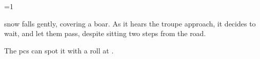 
\ifnum\value{cycle}=1

  \Gls{snow} falls gently, covering a boar.
  As it hears the troupe approach, it decides to wait, and let them pass, despite sitting two \glspl{step} from the road.

  \boar

  The \glspl{pc} can spot it with a  roll at \tn[10].
  
\fi


